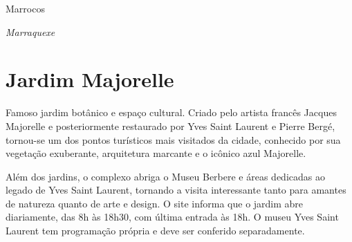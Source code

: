 
\pagebreak
\thispagestyle{empty}
\mbox{}
\begin{center}

\vspace{3cm}

{\brabo\HUGE Marrocos}
\end{center}
\pagebreak


\blankpage
\pagebreak
\thispagestyle{empty}
\mbox{}
\begin{center}

\vspace{3cm}



{\brabo\HUGE\itshape Marraquexe}
\end{center}
\pagebreak



\chapter*{Jardim Majorelle}

Famoso jardim botânico e espaço cultural. Criado pelo artista francês Jacques Majorelle e posteriormente restaurado por Yves Saint Laurent e Pierre Bergé, tornou-se um dos pontos turísticos mais visitados da cidade, conhecido por sua vegetação exuberante, arquitetura marcante e o icônico azul \mbox{Majorelle}. 

Além dos jardins, o complexo abriga o Museu Berbere e áreas dedicadas ao legado de Yves Saint Laurent, tornando a visita interessante tanto para amantes de natureza quanto de arte e design. O site informa que o jardim abre diariamente, das 8h às 18h30, com última entrada às 18h. O museu Yves Saint Laurent tem programação própria e deve ser conferido separadamente.

